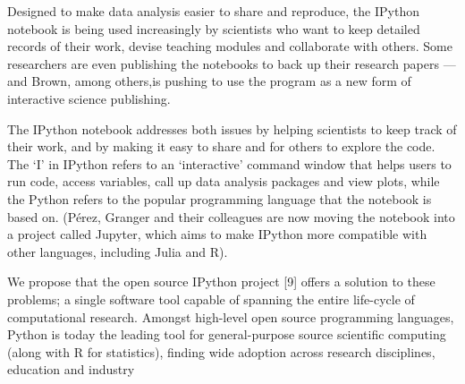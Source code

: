 Designed to make data analysis easier to share and reproduce, the IPython notebook is being used increasingly by scientists who want to keep detailed records of their work, devise teaching modules and collaborate with others. Some researchers are even publishing the notebooks to back up their research papers — and Brown, among others,is pushing to use the program as a new form of interactive science publishing. \cite{shen2014interactive}

The IPython notebook addresses both issues
by helping scientists to keep track of their work,
and by making it easy to share and for others
to explore the code. The ‘I’ in IPython refers to
an ‘interactive’ command window that helps
users to run code, access variables, call up data
analysis packages and view plots, while the
Python refers to the popular programming
language that the notebook is based on. (Pérez,
Granger and their colleagues are now moving
the notebook into a project called Jupyter, which
aims to make IPython more compatible with
other languages, including Julia and R). \cite{perez2013open}

We propose that the open source IPython project [9] offers a solution to these problems; a single software tool capable of spanning the entire life-cycle of computational research. Amongst high-level open source programming languages, Python is today the leading tool for general-purpose source scientific computing (along with R for statistics), finding wide adoption across research disciplines, education and industry 
